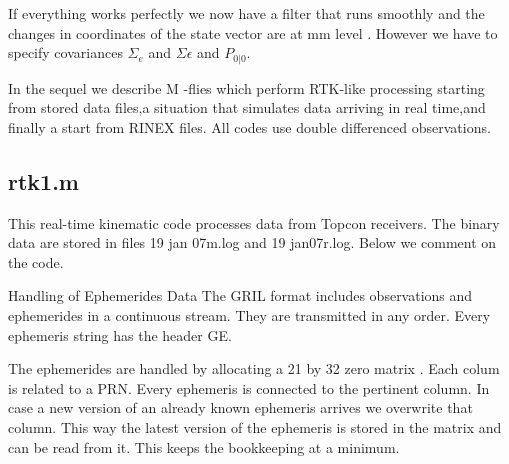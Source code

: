 If everything works perfectly we now have a filter that runs smoothly and the changes in coordinates of the state vector are at mm level . However we have to specify covariances $\Sigma_{e}$ and $\Sigma\epsilon$ and $P_{0|0}$.

In the sequel we describe M -flies which perform RTK-like processing starting from stored data files,a situation that simulates data arriving in real time,and finally a start from RINEX files. All codes use double differenced observations.

\subsection{rtk1.m}

This real-time kinematic code processes data from Topcon receivers. The binary data are
stored in files 19 jan 07m.log and 19 jan07r.log. Below we comment on the code.

Handling of Ephemerides Data The GRIL format includes observations and ephemerides
in a continuous stream. They are transmitted in any order. Every ephemeris string has the
header GE.

The ephemerides are handled by allocating a 21 by 32 zero matrix . Each colum is related to a PRN. Every ephemeris is connected to the pertinent column. In case a new version of an already known ephemeris arrives we overwrite that column. This way the latest version of the ephemeris is stored in the matrix and can be read from it. This keeps the bookkeeping at a minimum.

